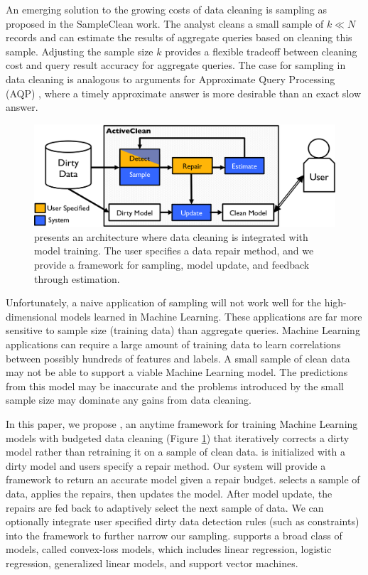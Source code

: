 An emerging solution to the growing costs of data cleaning is sampling as proposed in the SampleClean work\cite{wang1999sample}. The analyst cleans a small sample of $k \ll N$ records and can estimate the results of aggregate queries based on cleaning this sample.
Adjusting the sample size $k$ provides a flexible tradeoff between cleaning cost and query result accuracy for aggregate queries.
The case for sampling in data cleaning is analogous to arguments for Approximate Query Processing (AQP) \cite{DBLP:conf/eurosys/AgarwalMPMMS13}, where a timely approximate answer is more desirable than an exact slow answer. 

\begin{figure}[t]
\centering
 \includegraphics[width=\columnwidth]{figs/arch.png}
 \caption{\sysfull presents an architecture where data cleaning is integrated with model training. The user specifies a data repair method, and we provide a framework for sampling, model update, and feedback through estimation. \label{sys-arch}}\vspace{-2em}
\end{figure}

Unfortunately, a naive application of sampling will not work well for the high-dimensional models learned in Machine Learning.
These applications are far more sensitive to sample size (training data) than aggregate queries.
Machine Learning applications can require a large amount of training data to learn correlations between possibly hundreds of features and labels.
A small sample of clean data may not be able to support a viable Machine Learning model.
The predictions from this model may be inaccurate and the problems introduced by the small sample size may dominate any gains from data cleaning. 

In this paper, we propose \sys, an anytime framework for training Machine Learning models with budgeted data cleaning (Figure \ref{sys-arch}) that iteratively corrects a dirty model rather than retraining it on a sample of clean data.
\sys is initialized with a dirty model and users specify a repair method.
Our system will provide a framework to return an accurate model given a repair budget.
\sys selects a sample of data, applies the repairs, then updates the model.
After model update, the repairs are fed back to adaptively select the next sample of data.
We can optionally integrate user specified dirty data detection rules (such as constraints) into the framework to further narrow our sampling.
\sys supports a broad class of models, called convex-loss models, which includes linear regression, logistic regression, generalized linear models, and support vector machines.


